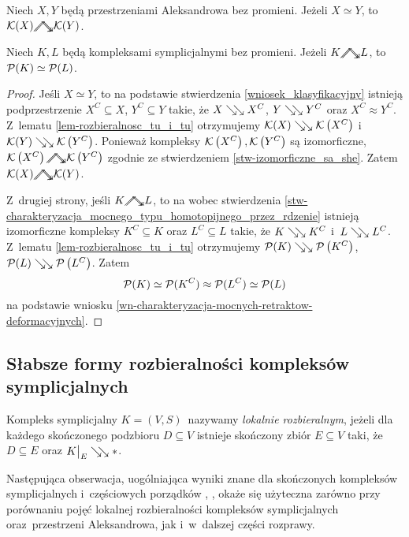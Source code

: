 \begin{wn}
Niech $X,Y$ będą przestrzeniami Aleksandrowa bez promieni. Jeżeli $X\simeq Y$, to $\mK(X)\stronghe \mK(Y)$.

Niech $K,L$ będą kompleksami symplicjalnymi bez promieni. Jeżeli $K\stronghe L$, to $\mathcal{P}(K)\simeq \mathcal{P}(L)$.
\end{wn}
\begin{proof}
Jeśli $X\simeq Y$, to na podstawie stwierdzenia \ref{wniosek_klasyfikacyjny} istnieją podprzestrzenie $X^C\subseteq X$, $Y^C\subseteq Y$ takie, że $X\searrow\!\!\searrow X^C$, $Y\searrow\!\!\searrow Y^C$ oraz $X^C\approx Y^C$. Z~lematu \ref{lem-rozbieralnosc_tu_i_tu} otrzymujemy $\mathcal{K}(X)\searrow\!\!\searrow \mathcal{K}\left(X^C\right)$ i~$\mathcal{K}(Y)\searrow\!\!\searrow \mathcal{K}\left(Y^C\right)$. Ponieważ kompleksy $\mathcal{K}\left(X^C\right), \mathcal{K}\left(Y^C\right)$ są izomorficzne, $\mK\left(X^C\right)\stronghe \mK\left(Y^C\right)$ zgodnie ze stwierdzeniem \ref{stw-izomorficzne_sa_she}. Zatem $\mK(X)\stronghe\mK(Y)$.

Z~drugiej strony, jeśli $K\stronghe L$, to na wobec stwierdzenia \ref{stw-charakteryzacja_mocnego_typu_homotopijnego_przez_rdzenie} istnieją izomorficzne kompleksy $K^C\subseteq K$ oraz $L^C\subseteq L$ takie, że $K\searrow\!\!\searrow K^C$ i~$L\searrow\!\!\searrow L^C$. Z~lematu \ref{lem-rozbieralnosc_tu_i_tu} otrzymujemy $\mathcal{P}(K)\searrow\!\!\searrow \mathcal{P}\left(K^C\right)$, $\mathcal{P}(L)\searrow\!\!\searrow \mathcal{P}\left(L^C\right)$. Zatem \[\mathcal{P}(K)\simeq \mathcal{P}(K^C)\approx \mathcal{P}(L^C)\simeq \mathcal{P}(L)\] na podstawie wniosku \ref{wn-charakteryzacja-mocnych-retraktow-deformacyjnych}.
\end{proof}




\subsection{Słabsze formy rozbieralności kompleksów symplicjalnych}
Kompleks symplicjalny $K=(V,S)$~nazywamy \textit{lokalnie rozbieralnym}, jeżeli dla każdego skończonego podzbioru $D\subseteq V$ istnieje skończony zbiór $E\subseteq V$ taki, że $D\subseteq E$ oraz $K\big|_E\searrow\!\!\searrow *$.

Następująca obserwacja, uogólniająca wyniki znane dla skończonych kompleksów symplicjalnych i~częściowych porządków \cite[Theorem 4.15, Corollary 4.18]{Barmak12}, \cite{Ginsburg94}, okaże się użyteczna zarówno przy porównaniu pojęć lokalnej rozbieralności kompleksów symplicjalnych oraz~przestrzeni Aleksandrowa, jak i~w~dalszej części rozprawy.

